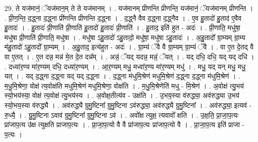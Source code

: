 \documentclass[17pt]{extarticle}
\begin{document}
29. ते यज॑मानं॒ ॅयज॑मान॒म् ते ते यज॑मानम् । . यज॑मानम् प्रीणन्ति प्रीणन्ति॒ यज॑मानं॒ ॅयज॑मानम् प्रीणन्ति । . प्री॒ण॒न्ति॒ द॒द्ध्ना द॒द्ध्ना प्री॑णन्ति प्रीणन्ति द॒द्ध्ना । . द॒द्ध्नै वैव द॒द्ध्ना द॒द्ध्नैव । . ए॒व हु॒तादो॑ हु॒ताद॑ ए॒वैव हु॒तादः॑ । . हु॒तादः॑ प्री॒णाति॑ प्री॒णाति॑ हु॒तादो॑ हु॒तादः॑ प्री॒णाति॑ । . हु॒ताद॒ इति॑ हुत - अदः॑ । . प्री॒णाति॒ मधु॑षा॒ मधु॑षा प्री॒णाति॑ प्री॒णाति॒ मधु॑षा । . मधु॑षा ऽहु॒तादो॑ ऽहु॒तादो॒ मधु॑षा॒ मधु॑षा ऽहु॒तादः॑ । . अ॒हु॒तादो᳚ ग्रा॒म्यम् ग्रा॒म्य म॑हु॒तादो॑ ऽहु॒तादो᳚ ग्रा॒म्यम् । . अ॒हु॒ताद॒ इत्य॑हुत - अदः॑ । . ग्रा॒म्यं ॅवै वै ग्रा॒म्यम् ग्रा॒म्यं ॅवै । . वा ए॒त दे॒तद् वै वा ए॒तत् । . ए॒त दन्न॒ मन्न॑ मे॒त दे॒त दन्न᳚म् । . अन्नं॒ ॅयद् यदन्न॒ मन्नं॒ ॅयत् । . यद् दधि॒ दधि॒ यद् यद् दधि॑ । . दध्या॑र॒ण्य मा॑र॒ण्यम् दधि॒ दध्या॑र॒ण्यम् । . आ॒र॒ण्यम् मधु॒ मध्वा॑र॒ण्य मा॑र॒ण्यम् मधु॑ । . मधु॒ यद् यन् मधु॒ मधु॒ यत् । . यद् द॒द्ध्ना द॒द्ध्ना यद् यद् द॒द्ध्ना । . द॒द्ध्ना म॑धुमि॒श्रेण॑ मधुमि॒श्रेण॑ द॒द्ध्ना द॒द्ध्ना म॑धुमि॒श्रेण॑ । . म॒धु॒मि॒श्रेणा॒ वोक्ष॑ त्य॒वोक्ष॑ति मधुमि॒श्रेण॑ मधुमि॒श्रेणा॒ वोक्ष॑ति । . म॒धु॒मि॒श्रेणेति॑ मधु - मि॒श्रेण॑ । . अ॒वोक्ष॑ त्यु॒भय॑ स्यो॒भय॑स्या॒ वोक्ष॑ त्य॒वोक्ष॑ त्यु॒भय॑स्य । . अ॒वोक्ष॒तीत्य॑व - उक्ष॑ति । . उ॒भय॒स्या व॑रुद्ध्या॒ अव॑रुद्ध्या उ॒भय॑ स्यो॒भय॒स्या व॑रुद्ध्यै । . अव॑रुद्ध्यै ग्रुमु॒ष्टिना᳚ ग्रुमु॒ष्टिना ऽव॑रुद्ध्या॒ अव॑रुद्ध्यै ग्रुमु॒ष्टिना᳚ । . अव॑रुद्ध्या॒ इत्यव॑ - रु॒ध्यै॒ । . ग्रु॒मु॒ष्टिना ऽवाव॑ ग्रुमु॒ष्टिना᳚ ग्रुमु॒ष्टिना ऽव॑ । . अवो᳚क्ष त्युक्ष॒ त्यवावो᳚ क्षति । . उ॒क्ष॒ति॒ प्रा॒जा॒प॒त्यः प्रा॑जाप॒त्य उ॑क्ष त्युक्षति प्राजाप॒त्यः । . प्रा॒जा॒प॒त्यो वै वै प्रा॑जाप॒त्यः प्रा॑जाप॒त्यो वै । . प्रा॒जा॒प॒त्य इति॑ प्राजा - प॒त्यः । \newline
\end{document}
